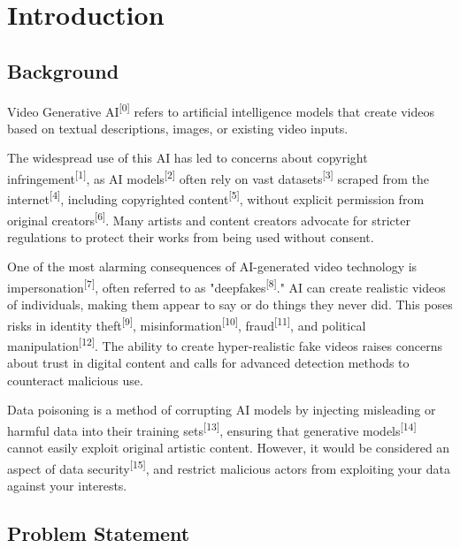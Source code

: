 \chapter{Introduction}
\label{chap:introduction}

\section{Background}
\label{section:background}

Video Generative AI\textsuperscript{[0]} refers to artificial intelligence models that create videos based on textual descriptions, images, or existing video inputs. 

The widespread use of this AI has led to concerns about copyright infringement\textsuperscript{[1]}, as AI models\textsuperscript{[2]} often rely on vast datasets\textsuperscript{[3]} scraped from the internet\textsuperscript{[4]}, including copyrighted content\textsuperscript{[5]}, without explicit permission from original creators\textsuperscript{[6]}. Many artists and content creators advocate for stricter regulations to protect their works from being used without consent.

One of the most alarming consequences of AI-generated video technology is impersonation\textsuperscript{[7]}, often referred to as "deepfakes\textsuperscript{[8]}." AI can create realistic videos of individuals, making them appear to say or do things they never did. This poses risks in identity theft\textsuperscript{[9]}, misinformation\textsuperscript{[10]}, fraud\textsuperscript{[11]}, and political manipulation\textsuperscript{[12]}. The ability to create hyper-realistic fake videos raises concerns about trust in digital content and calls for advanced detection methods to counteract malicious use.

Data poisoning is a method of corrupting AI models by injecting misleading or harmful data into their training sets\textsuperscript{[13]}, ensuring that generative models\textsuperscript{[14]} cannot easily exploit original artistic content. However, it would be considered an aspect of data security\textsuperscript{[15]}, and restrict malicious actors from exploiting your data against your interests.

\section{Problem Statement}
\label{section:problem-statement}

